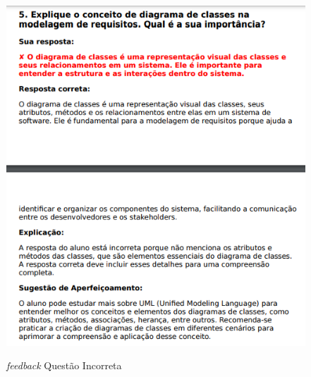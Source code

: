 \begin{figure}[H]
    \centering
    \caption{\textit{feedback} Questão Incorreta}
    \includegraphics[width=1\textwidth]{figuras/feedback_3.png}
    \label{fig:report_questions}
\end{figure}